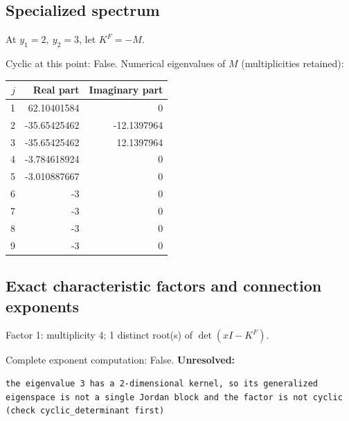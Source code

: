 \documentclass[10pt,a4paper]{article}
\newcommand{\fitmath}[1]{\sbox{\mathbox}{$\displaystyle #1$}\ifdim\wd\mathbox>\linewidth\resizebox{\linewidth}{!}{\usebox{\mathbox}}\else\usebox{\mathbox}\fi}
\begin{document}
\subsection*{Specialized spectrum}
At $y_1=2,\ y_2=3$, let $K^F=-M$.
\begin{center}\fitmath{\Delta=0}\end{center}
Cyclic at this point: False.
Numerical eigenvalues of $M$ (multiplicities retained):
\begin{center}\small\begin{tabular}{rrr}\toprule $j$ & Real part & Imaginary part\\\midrule
1 & 62.10401584 & 0\\
2 & -35.65425462 & -12.1397964\\
3 & -35.65425462 & 12.1397964\\
4 & -3.784618924 & 0\\
5 & -3.010887667 & 0\\
6 & -3 & 0\\
7 & -3 & 0\\
8 & -3 & 0\\
9 & -3 & 0\\
\bottomrule\end{tabular}\end{center}
\subsection*{Exact characteristic factors and connection exponents}
Factor 1: multiplicity 4; 1 distinct root(s) of $\det(xI-K^F)$.
\begin{center}\fitmath{\begin{aligned}p_{1}(x)&=x - 3\end{aligned}}\end{center}
Complete exponent computation: False.
\textbf{Unresolved:}

\begin{lstlisting}
the eigenvalue 3 has a 2-dimensional kernel, so its generalized eigenspace is not a single Jordan block and the factor is not cyclic (check cyclic_determinant first)
\end{lstlisting}
\end{document}
